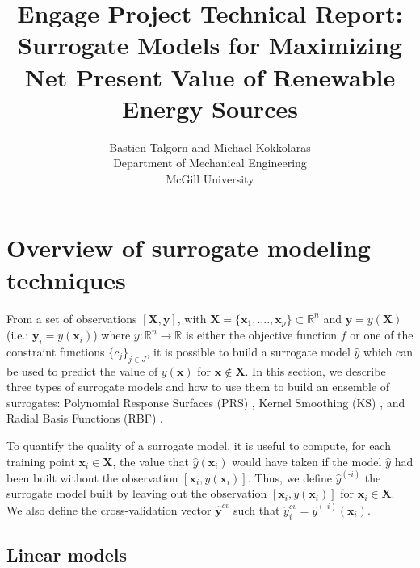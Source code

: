 \documentclass[12pt]{article}
\title{Engage Project Technical Report:\\
Surrogate Models for Maximizing Net Present
Value of Renewable Energy Sources
}
\author{Bastien Talgorn and Michael Kokkolaras\\
Department of Mechanical Engineering\\
McGill University}
\def\R{{\mathbb{R}}}
\newcommand{\y}{\mathbf{y}}
\newcommand{\x}{\mathbf{x}}
\newcommand{\yh}{\hat{y}}
\newcommand{\ycv}{\hat{\y}^{cv}}
\newcommand{\X}{\mathbf{X}}
\newcommand{\noti}{^{(\text{-}i)}}
\begin{document}


\maketitle
\setlength{\parindent}{0pt}

\tableofcontents




\section{Overview of surrogate modeling techniques}
\label{sec:models}


From a set of observations $[\X,\y]$, 
  with $\X=\{\x_1,....,\x_p\} \subset \R^n$ and 
  $\y = y(\X)$ (i.e.: $\y_i = y(\x_i)$) 
  where $y:\R^n\rightarrow \R$ is either the objective function $f$ 
  or one of the constraint functions $\{c_j\}_{j\in J}$, 
  it is possible to build a surrogate model $\yh$ 
  which can be used to predict the value of $y(\x)$ for $\x\notin\X$.
In this section, we describe three types of surrogate models and how to use them to build an ensemble of surrogates:
Polynomial Response Surfaces (PRS)
\cite{AcarOptimizedWeight2009,MullerMixtureSurrogate2011,QueipoSbao2005},
Kernel Smoothing (KS)
\cite{AcarOptimizedWeight2009,hastie01statisticallearning}, 
and Radial Basis Functions (RBF)
\cite{buhmann2003radial,AcarOptimizedWeight2009,VianaEgoMusu2013,MullerMixtureSurrogate2011,QueipoSbao2005}.    


To quantify the quality of a surrogate model, 
  it is useful to compute,
for each training point $\x_i\in \X$, 
  the value that $\yh(\x_i)$ would have taken if the model $\yh$ 
  had been built without the observation $[\x_i,y(\x_i)]$. 
Thus, we define $\yh\noti$ the surrogate model built by leaving out the observation $[\x_i,y(\x_i)]$ for $\x_i \in \X$. We also define the cross-validation vector $\ycv$ such that $\yh^{cv}_i = \yh\noti(\x_i)$.


\subsection{Linear models}
\label{sec:linear}
\renewcommand{\a}{\boldsymbol{\alpha}}
\end{document}
